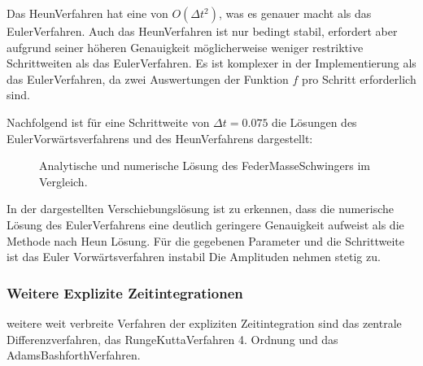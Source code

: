 \documentclass[letterpaper,10pt,german]{jupyterBook}
\let\sphinxpxdimen\pdfpxdimen\else\newdimen\sphinxpxdimen
\begin{document}
\sphinxAtStartPar
Das Heun\sphinxhyphen{}Verfahren hat eine  von \( O(\Delta t^2) \), was es genauer macht als das Euler\sphinxhyphen{}Verfahren.
Auch das Heun\sphinxhyphen{}Verfahren ist nur bedingt stabil, erfordert aber aufgrund seiner höheren Genauigkeit möglicherweise weniger restriktive Schrittweiten als das Euler\sphinxhyphen{}Verfahren.
Es ist komplexer in der Implementierung als das Euler\sphinxhyphen{}Verfahren, da zwei Auswertungen der Funktion \( f \) pro Schritt erforderlich sind.

\sphinxAtStartPar
Nachfolgend ist für eine Schrittweite von \(\Delta t = 0.075\) die Lösungen des Euler\sphinxhyphen{}Vorwärtsverfahrens und des Heun\sphinxhyphen{}Verfahrens dargestellt:

\begin{figure}[htbp]
\centering
\capstart

\noindent\sphinxincludegraphics[width=500\sphinxpxdimen]{{Federschwinger_Euler}.png}
\caption{Analytische und numerische Lösung des Feder\sphinxhyphen{}Masse\sphinxhyphen{}Schwingers im Vergleich.}\label{\detokenize{chapters/chapter6/TransienteDynamik:loesung-federmasseschwinger-numerisch-explizit}}\end{figure}

\sphinxAtStartPar
In der dargestellten Verschiebungslösung ist zu erkennen, dass die numerische Lösung des Euler\sphinxhyphen{}Verfahrens eine deutlich geringere Genauigkeit aufweist als die Methode nach Heun Lösung. Für die gegebenen Parameter und die Schrittweite ist das Euler Vorwärtsverfahren instabil \sphinxhyphen{} Die Amplituden nehmen stetig zu.


\subsubsection{Weitere Explizite Zeitintegrationen}
\label{\detokenize{chapters/chapter6/TransienteDynamik:weitere-explizite-zeitintegrationen}}
\sphinxAtStartPar
weitere weit verbreite Verfahren der expliziten Zeitintegration sind das zentrale Differenzverfahren, das Runge\sphinxhyphen{}Kutta\sphinxhyphen{}Verfahren 4. Ordnung und das Adams\sphinxhyphen{}Bashforth\sphinxhyphen{}Verfahren.
\end{document}

